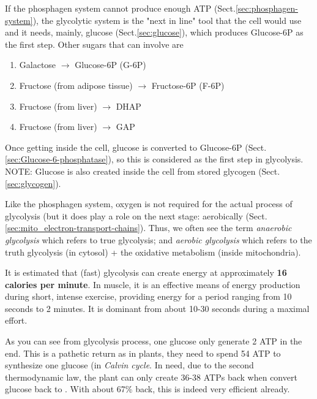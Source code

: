 If the phosphagen system cannot produce enough ATP
(Sect.\ref{sec:phosphagen-system}), the glycolytic system is the "next in line"
tool that the cell would use and it needs, mainly, glucose
(Sect.\ref{sec:glucose}), which produces Glucose-6P as the first step.
Other sugars that can involve are
\begin{enumerate}
  \item Galactose $\rightarrow$ Glucose-6P (G-6P)

  \item Fructose (from adipose tissue) $\rightarrow$ Fructose-6P (F-6P)
  \item Fructose (from liver) $\rightarrow$  DHAP
  \item Fructose (from liver) $\rightarrow$ GAP
\end{enumerate}
Once getting inside the cell, glucose is converted to Glucose-6P
(Sect.\ref{sec:Glucose-6-phosphatase}), so this is considered as the first step
in glycolysis. NOTE: Glucose is also created inside the cell from stored
glycogen (Sect.\ref{sec:glycogen}).

Like the phosphagen system, oxygen is not required for the actual process of
glycolysis (but it does play a role on the next stage:
aerobically (Sect.\ref{sec:mito_electron-transport-chains}).
Thus, we often see the term {\it anaerobic glycolysis} which refers to true
glycolysis; and {\it aerobic glycolysis} which refers to the truth glycolysis
(in cytosol) + the oxidative metabolism (inside mitochondria).

It is estimated that (fast) glycolysis can create energy at approximately {\bf
16 calories per minute}. In muscle, it is an effective means of energy production
during short, intense exercise, providing energy for a period ranging from 10
seconds to 2 minutes. It is dominant from about 10-30 seconds during a maximal
effort.



\begin{mdframed}
As you can see from glycolysis process, one glucose only generate 2
ATP in the end. This is a pathetic return as in plants, they need to
spend 54 ATP to synthesize one glucose (in {\it Calvin cycle}. In
need, due to the second thermodynamic law, the plant can only create
36-38 ATPs back when convert glucose back to . With about 67\%
back, this is indeed very efficient already.
\end{mdframed}

